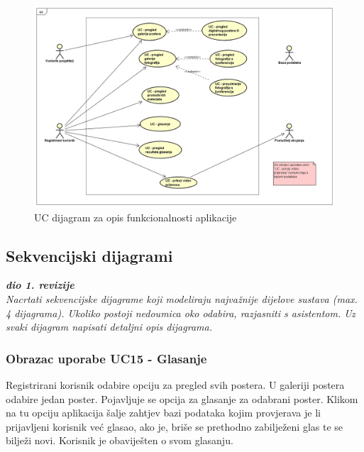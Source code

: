 					\begin{figure}
						\includegraphics[width=\linewidth]{Slike/UCDiagramAppFunctionalities.png}
						\caption{UC dijagram za opis funkcionalnosti aplikacije}
					\end{figure}
				
				\eject		
				
			\subsection{Sekvencijski dijagrami}
				
				\textbf{\textit{dio 1. revizije}}\\
				
				\textit{Nacrtati sekvencijske dijagrame koji modeliraju najvažnije dijelove sustava (max. 4 dijagrama). Ukoliko postoji nedoumica oko odabira, razjasniti s asistentom. Uz svaki dijagram napisati detaljni opis dijagrama.}
				
				\subsubsection{Obrazac uporabe UC15 - Glasanje}
				Registrirani korisnik odabire opciju za pregled svih postera. U galeriji postera odabire jedan poster. Pojavljuje se opcija za glasanje za odabrani poster. Klikom na tu opciju aplikacija šalje zahtjev bazi podataka kojim provjerava je li prijavljeni korisnik već glasao, ako je, briše se prethodno zabilježeni glas te se bilježi novi. Korisnik  je obaviješten o svom glasanju.
				
				\newpage
				
